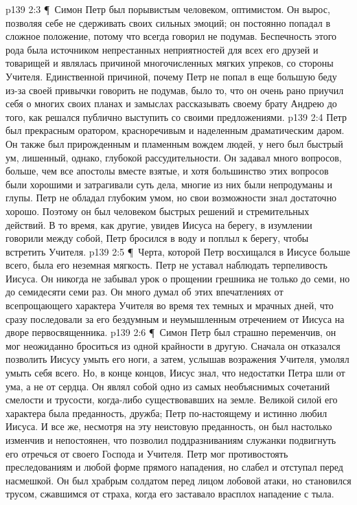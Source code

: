 \vs p139 2:3 \P\ Симон Петр был порывистым человеком, оптимистом. Он вырос, позволяя себе не сдерживать своих сильных эмоций; он постоянно попадал в сложное положение, потому что всегда говорил не подумав. Беспечность этого рода была источником непрестанных неприятностей для всех его друзей и товарищей и являлась причиной многочисленных мягких упреков, со стороны Учителя. Единственной причиной, почему Петр не попал в еще большую беду из\hyp{}за своей привычки говорить не подумав, было то, что он очень рано приучил себя о многих своих планах и замыслах рассказывать своему брату Андрею до того, как решался публично выступить со своими предложениями.
\vs p139 2:4 Петр был прекрасным оратором, красноречивым и наделенным драматическим даром. Он также был прирожденным и пламенным вождем людей, у него был быстрый ум, лишенный, однако, глубокой рассудительности. Он задавал много вопросов, больше, чем все апостолы вместе взятые, и хотя большинство этих вопросов были хорошими и затрагивали суть дела, многие из них были непродуманы и глупы. Петр не обладал глубоким умом, но свои возможности знал достаточно хорошо. Поэтому он был человеком быстрых решений и стремительных действий. В то время, как другие, увидев Иисуса на берегу, в изумлении говорили между собой, Петр бросился в воду и поплыл к берегу, чтобы встретить Учителя.
\vs p139 2:5 \P\ Черта, которой Петр восхищался в Иисусе больше всего, была его неземная мягкость. Петр не уставал наблюдать терпеливость Иисуса. Он никогда не забывал урок о прощении грешника не только до семи, но до семидесяти семи раз. Он много думал об этих впечатлениях от всепрощающего характера Учителя во время тех темных и мрачных дней, что сразу последовали за его бездумным и неумышленным отречением от Иисуса на дворе первосвященника.
\vs p139 2:6 \P\ Симон Петр был страшно переменчив, он мог неожиданно броситься из одной крайности в другую. Сначала он отказался позволить Иисусу умыть его ноги, а затем, услышав возражения Учителя, умолял умыть себя всего. Но, в конце концов, Иисус знал, что недостатки Петра шли от ума, а не от сердца. Он являл собой одно из самых необъяснимых сочетаний смелости и трусости, когда\hyp{}либо существовавших на земле. Великой силой его характера была преданность, дружба; Петр по\hyp{}настоящему и истинно любил Иисуса. И все же, несмотря на эту неистовую преданность, он был настолько изменчив и непостоянен, что позволил поддразниваниям служанки подвигнуть его отречься от своего Господа и Учителя. Петр мог противостоять преследованиям и любой форме прямого нападения, но слабел и отступал перед насмешкой. Он был храбрым солдатом перед лицом лобовой атаки, но становился трусом, сжавшимся от страха, когда его заставало врасплох нападение с тыла.
